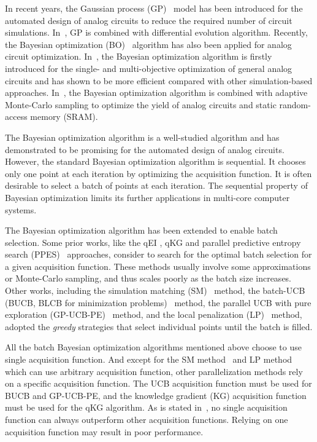 
In recent years, the Gaussian process (GP)~\cite{GPML} model has been
introduced for the automated design of analog circuits to reduce the
required number of circuit simulations. In~\cite{liu2014gaspad}, GP is combined
with differential evolution algorithm. Recently, the Bayesian optimization
(BO)~\cite{shahriari2016taking} algorithm has also been applied for analog
circuit optimization. In~\cite{lyu2017efficient}, the Bayesian optimization
algorithm is firstly introduced for the single- and multi-objective
optimization of general analog circuits and has shown to be more efficient
compared with other simulation-based approaches. In~\cite{wang2017efficient},
the Bayesian optimization algorithm is combined with adaptive Monte-Carlo
sampling to optimize the yield of analog circuits and static random-access
memory (SRAM).

The Bayesian optimization algorithm is a well-studied algorithm and has
demonstrated to be promising for the automated design of analog circuits.
However, the standard Bayesian optimization algorithm is sequential. It chooses
only one point at each iteration by optimizing the acquisition function. It is
often desirable to select a batch of points at each iteration. The sequential
property of Bayesian optimization limits its further applications in multi-core computer systems.

The Bayesian optimization algorithm has been extended to enable batch
selection. Some prior works, like the qEI \cite{qEI}, qKG \cite{wu2016parallel}
and parallel predictive entropy search (PPES)~\cite{shah2015parallel}
approaches, consider to search for the optimal batch selection for a given
acquisition function. These methods usually involve some approximations or
Monte-Carlo sampling, and thus scales poorly as the batch size increases. Other
works, including the simulation matching (SM)~\cite{azimi2010batch} method, the
batch-UCB (BUCB, BLCB for minimization
problems)~\cite{desautels2014parallelizing} method, the parallel UCB with pure
exploration (GP-UCB-PE)~\cite{contal2013parallel} method, and the local
penalization (LP)~\cite{gonzalez2016batch} method, adopted the \emph{greedy}
strategies that select individual points until the batch is filled.

All the batch Bayesian optimization algorithms mentioned above choose to use single acquisition function.
And except for the SM method~\cite{azimi2010batch} and LP method~\cite{gonzalez2016batch} which can use arbitrary acquisition
function, other parallelization methods rely on a specific acquisition
function. The UCB acquisition function must be used for BUCB and GP-UCB-PE, and
the knowledge gradient (KG) acquisition function must be used for the qKG algorithm. As is stated
in~\cite{hoffman2011portfolio}, no single acquisition function can always
outperform other acquisition functions. Relying on one acquisition function may
result in poor performance.

